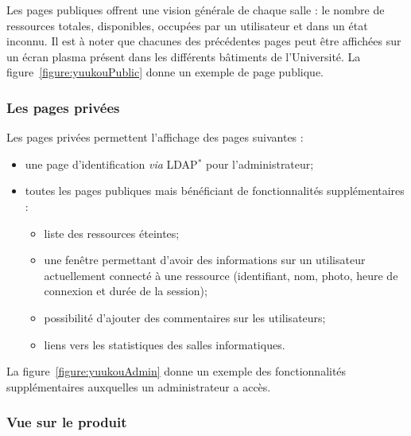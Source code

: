 \vspace{0.20cm}

Les pages publiques offrent une vision g\'en\'erale de chaque salle : le nombre de ressources totales, disponibles, occup\'ees par un utilisateur et dans un \'etat inconnu.
Il est \`a noter que chacunes des pr\'ec\'edentes pages peut \^etre affich\'ees sur un \'ecran plasma pr\'esent dans les diff\'erents b\^atiments de l'Universit\'e.
La figure~\ref{figure:yuukouPublic} donne un exemple de page publique.

\subsubsection{Les pages priv\'ees}

\noindent Les pages priv\'ees permettent l'affichage des pages suivantes :

\begin{itemize}
	\item une page d'identification \textit{via} LDAP$^*$ pour l'administrateur;
	\item toutes les pages publiques mais b\'en\'eficiant de fonctionnalit\'es suppl\'ementaires :

	\begin{itemize}
		\item liste des ressources \'eteintes;
		\item une fen\^etre permettant d'avoir des informations sur un utilisateur actuellement connect\'e \`a une ressource (identifiant, nom, photo, heure de connexion et dur\'ee de la session);
		\item possibilit\'e d'ajouter des commentaires sur les utilisateurs;
		\item liens vers les statistiques des salles informatiques.

	\end{itemize}

\end{itemize}

\vspace{0.20cm}

La figure~\ref{figure:yuukouAdmin} donne un exemple des fonctionnalit\'es suppl\'ementaires auxquelles un administrateur a acc\`es.

\clearpage

\subsubsection{Vue sur le produit}

